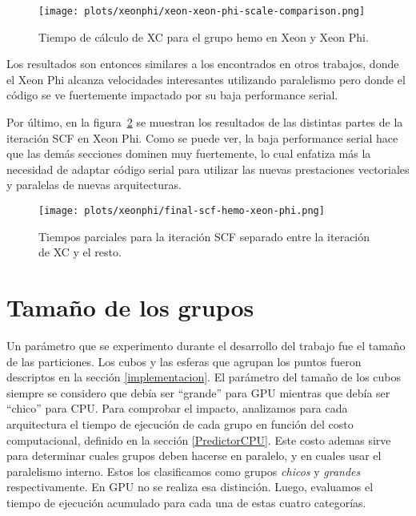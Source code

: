 \begin{figure}[htbp]
   \centering
   \texttt{[image: plots/xeonphi/xeon-xeon-phi-scale-comparison.png]}
   \caption{Tiempo de c\'alculo de XC para el grupo hemo en Xeon y Xeon Phi.}
   \label{fig:xeon-xeon-phi-parallelized-iteration}
\end{figure}

Los resultados son entonces similares a los encontrados en otros trabajos,
donde el Xeon Phi alcanza velocidades interesantes utilizando paralelismo
pero donde el c\'odigo se ve fuertemente impactado por su baja performance serial.

Por \'ultimo, en la figura~\ref{fig:group-times-scf-xeon-phi} se muestran los resultados
de las distintas partes de la iteraci\'on SCF en Xeon Phi. Como se puede ver, la baja performance
serial hace que las dem\'as secciones dominen muy fuertemente, lo cual enfatiza m\'as la necesidad
de adaptar c\'odigo serial para utilizar las nuevas prestaciones vectoriales y paralelas de nuevas
arquitecturas.

\begin{figure}[htbp]
   \centering
   \texttt{[image: plots/xeonphi/final-scf-hemo-xeon-phi.png]}
   \caption{Tiempos parciales para la iteraci\'on SCF separado entre la iteraci\'on de XC y el resto.}
   \label{fig:group-times-scf-xeon-phi}
\end{figure}


\section{Tama\~no de los grupos}
\label{tamgrupos}
Un par\'ametro que se experimento durante el desarrollo del trabajo fue el tama\~no de las particiones.
Los cubos y las esferas que agrupan los puntos fueron descriptos en la secci\'on \ref{implementacion}. El par\'ametro
del tama\~no de los cubos siempre se considero que deb\'ia ser ``grande'' para GPU mientras que deb\'ia ser
``chico'' para CPU. Para comprobar el impacto, analizamos para cada arquitectura el tiempo de ejecuci\'on
de cada grupo en funci\'on del costo computacional, definido en la secci\'on \ref{PredictorCPU}. Este costo ademas
sirve para determinar cuales grupos deben hacerse en paralelo, y en cuales usar el paralelismo interno. Estos
los clasificamos como grupos \textit{chicos} y \textit{grandes} respectivamente. En GPU no se realiza esa
distinci\'on. Luego, evaluamos el tiempo de ejecuci\'on acumulado para cada una de estas cuatro categor\'ias.

